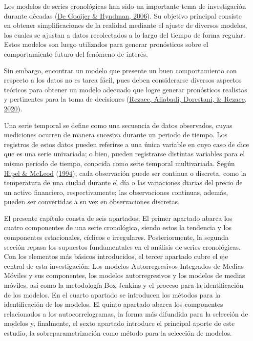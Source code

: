 \documentclass[
]{article}
\begin{document}
Los modelos de series cronológicas han sido un importante tema de
investigación durante décadas (\protect\hyperlink{ref-tsa_decades}{De
Gooijer \& Hyndman, 2006}). Su objetivo principal consiste en obtener
simplificaciones de la realidad mediante el ajuste de diversos modelos,
los cuales se ajustan a datos recolectados a lo largo del tiempo de
forma regular. Estos modelos son luego utilizados para generar
pronósticos sobre el comportamiento futuro del fenómeno de interés.

Sin embargo, encontrar un modelo que presente un buen comportamiento con
respecto a los datos no es tarea fácil, pues deben considerarse diversos
aspectos teóricos para obtener un modelo adecuado que logre generar
pronósticos realistas y pertinentes para la toma de decisiones
(\protect\hyperlink{ref-tsa_decision_making}{Rezaee, Aliabadi,
Dorestani, \& Rezaee, 2020}).

Una serie temporal se define como una secuencia de datos observados,
cuyas mediciones ocurren de manera sucesiva durante un periodo de
tiempo. Los registros de estos datos pueden referirse a una única
variable en cuyo caso de dice que es una serie univariada; o bien,
pueden registrarse distintas variables para el mismo periodo de tiempo,
conocida como serie temporal multivariada. Según
\protect\hyperlink{ref-Hipel}{Hipel \& McLeod}
(\protect\hyperlink{ref-Hipel}{1994}), cada observación puede ser
continua o discreta, como la temperatura de una ciudad durante el día o
las variaciones diarias del precio de un activo financiero,
respectivamente; las observaciones continuas, además, pueden ser
convertidas a su vez en observaciones discretas.

El presente capítulo consta de seis apartados: El primer apartado abarca
los cuatro componentes de una serie cronológica, siendo estos la
tendencia y los componentes estacionales, cíclicos e irregulares.
Posteriormente, la segunda sección repasa los supuestos fundamentales en
el análisis de series cronológicas. Con los elementos más básicos
introducidos, el tercer apartado cubre el eje central de esta
investigación: Los modelos Autorregresivos Integrados de Medias Móviles
y sus componentes, los modelos autorregresivos y los modelos de medias
móviles, así como la metodología Box-Jenkins y el proceso para la
identificación de los modelos. En el cuarto apartado se introducen los
métodos para la identificación de los modelos. El quinto apartado abarca
los componentes relacionados a los autocorrelogramas, la forma más
difundida para la selección de modelos y, finalmente, el sexto apartado
introduce el principal aporte de este estudio, la sobreparametrización
como método para la selección de modelos.
\end{document}
